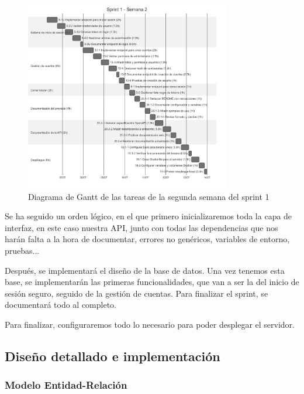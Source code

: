 \begin{figure}[H]
    \begin{center}
        \includegraphics[width=0.8\textwidth]{assets/sprint1/sprint1-week2.png}
    \end{center}
    \caption{Diagrama de Gantt de las tareas de la segunda semana del sprint 1}\label{fig:sprint1-week2}
\end{figure}

Se ha seguido un orden lógico, en el que primero inicializaremos toda la capa de interfaz, en este caso nuestra API, junto con todas las dependencias que nos harán falta a la hora de documentar, errores no genéricos, variables de entorno, pruebas...

Después, se implementará el diseño de la base de datos. Una vez tenemos esta base, se implementarán las primeras funcionalidades, que van a ser la del inicio de sesión seguro, seguido de la gestión de cuentas. Para finalizar el sprint, se documentará todo al completo.

Para finalizar, configuraremos todo lo necesario para poder desplegar el servidor.

\subsection{Diseño detallado e implementación}

\subsubsection{Modelo Entidad-Relación}

